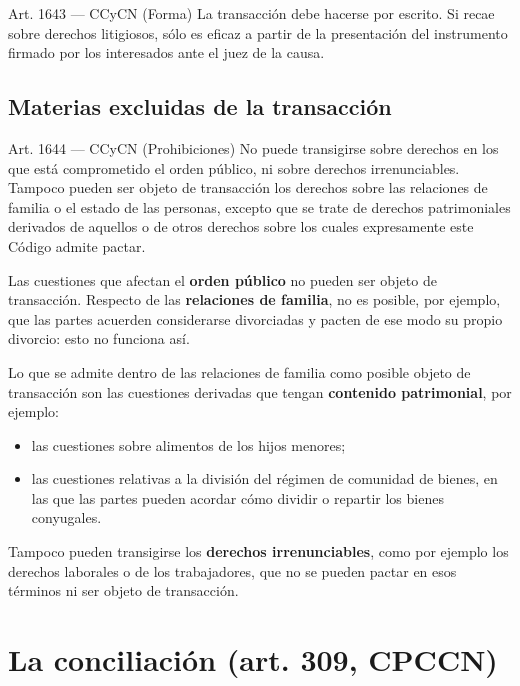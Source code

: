 \documentclass[12pt,oneside]{book}
\begin{document}
\begin{articulo}{Art. 1643 --- CCyCN (Forma)}
La transacción debe hacerse por escrito. Si recae sobre derechos litigiosos, sólo es eficaz a partir de la presentación del instrumento firmado por los interesados ante el juez de la causa.
\end{articulo}

\subsection{Materias excluidas de la transacción}

\begin{articulo}{Art. 1644 --- CCyCN (Prohibiciones)}
No puede transigirse sobre derechos en los que está comprometido el orden público, ni sobre derechos irrenunciables. Tampoco pueden ser objeto de transacción los derechos sobre las relaciones de familia o el estado de las personas, excepto que se trate de derechos patrimoniales derivados de aquellos o de otros derechos sobre los cuales expresamente este Código admite pactar.
\end{articulo}

Las cuestiones que afectan el \textbf{orden público} no pueden ser objeto de transacción. Respecto de las \textbf{relaciones de familia}, no es posible, por ejemplo, que las partes acuerden considerarse divorciadas y pacten de ese modo su propio divorcio: esto no funciona así.

Lo que se admite dentro de las relaciones de familia como posible objeto de transacción son las cuestiones derivadas que tengan \textbf{contenido patrimonial}, por ejemplo:

\begin{itemize}
    \item las cuestiones sobre alimentos de los hijos menores;
    \item las cuestiones relativas a la división del régimen de comunidad de bienes, en las que las partes pueden acordar cómo dividir o repartir los bienes conyugales.
\end{itemize}

Tampoco pueden transigirse los \textbf{derechos irrenunciables}, como por ejemplo los derechos laborales o de los trabajadores, que no se pueden pactar en esos términos ni ser objeto de transacción.

\section{La conciliación (art. 309, CPCCN)}
\end{document}
